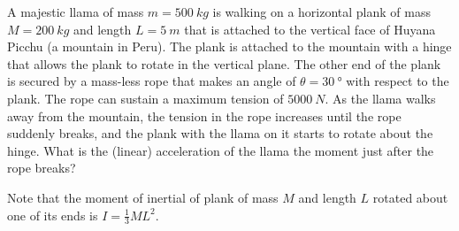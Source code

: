 \question A majestic llama of mass $m=\SI{500}{kg}$ is walking on a horizontal plank of mass $M=\SI{200}{kg}$ and length $L=\SI{5}{m}$ that is attached to the vertical face of Huyana Picchu (a mountain in Peru). The plank is attached to the mountain with a hinge that allows the plank to rotate in the vertical plane. The other end of the plank is secured by a mass-less rope that makes an angle of $\theta =\SI{30}{\degree}$ with respect to the plank. The rope can sustain a maximum tension of $\SI{5000}{N}$. As the llama walks away from the mountain, the tension in the rope increases until the rope suddenly breaks, and the plank with the llama on it starts to rotate about the hinge. What is the (linear) acceleration of the llama the moment just after the rope breaks? 

Note that the moment of inertial of plank of mass $M$ and length $L$ rotated about one of its ends is $I=\frac{1}{3}ML^2$.
